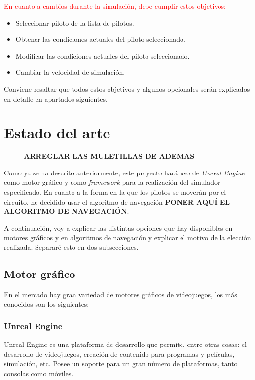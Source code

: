 \documentclass[a4paper,11pt]{book}
\begin{document}
\bigskip

\textcolor{red}{En cuanto a cambios durante la simulación, debe cumplir estos objetivos:}

\begin{itemize}
   \item Seleccionar piloto de la lista de pilotos.
   \item Obtener las condiciones actuales del piloto seleccionado.
   \item Modificar las condiciones actuales del piloto seleccionado.
   \item Cambiar la velocidad de simulación.
\end{itemize}

Conviene resaltar que todos estos objetivos y algunos opcionales serán explicados en detalle en apartados siguientes.

\section{Estado del arte}
\textbf{--------ARREGLAR LAS MULETILLAS DE ADEMAS--------} 
\bigskip

Como ya se ha descrito anteriormente, este proyecto hará uso de \textit{Unreal Engine} como motor gráfico y como \textit{framework} para la realización del simulador especificado. En cuanto a la forma en la que los pilotos se moverán por el circuito, he decidido usar el algoritmo de navegación \textbf{PONER AQUÍ EL ALGORITMO DE NAVEGACIÓN}.

\bigskip

A continuación, voy a explicar las distintas opciones que hay disponibles en motores gráficos y en algoritmos de navegación y explicar el motivo de la elección realizada. Separaré esto en dos subsecciones.

\subsection{Motor gráfico}
En el mercado hay gran variedad de motores gráficos de videojuegos, los más conocidos son los siguientes:

\subsubsection{Unreal Engine}
Unreal Engine \cite{unreal} es una plataforma de desarrollo que permite, entre otras cosas: el desarrollo de videojuegos, creación de contenido para programas y películas, simulación, etc. Posee un soporte para un gran número de plataformas, tanto consolas como móviles.
\end{document}
